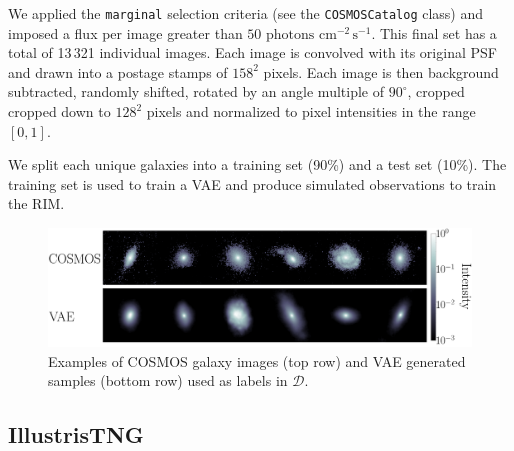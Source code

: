We applied the 
\texttt{marginal} selection criteria (see the \texttt{COSMOSCatalog} class) and imposed a flux per image
greater than $50\,\,\mathrm{photons}\,\,\mathrm{cm}^{-2}\,\mathrm{s}^{-1}$. 
This final set has a total of 13\,321 individual images.
Each image is convolved with its original PSF and drawn into a postage stamps of $158^2$ pixels. 
Each image is then 
background subtracted, randomly shifted, rotated by an angle multiple of $90^\circ$, cropped 
cropped down to $128^{2}$ pixels and normalized to pixel intensities in the range $[0,1]$.

We split each unique galaxies into a training set (90\%) and a test set (10\%). 
The training set is used to train a VAE and produce simulated observations 
to train the RIM.

\begin{figure}[t!]
        \centering
        \includegraphics[width=0.7\linewidth]{figures/gal_vae_sample}
        \caption{Examples of COSMOS galaxy images 
                (top row) and VAE generated samples (bottom row) used as labels in $\mathcal{D}$.}
        \label{fig:source}
\end{figure}


\subsection{IllustrisTNG}\label{sec:kappa}
